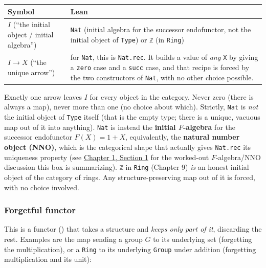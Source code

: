 \begin{longtable}[]{@{}
  >{\raggedright\arraybackslash}p{}
  >{\raggedright\arraybackslash}p{}@{}}
\toprule\noalign{}
\begin{minipage}[b]{\linewidth}\raggedright
Symbol
\end{minipage} & \begin{minipage}[b]{\linewidth}\raggedright
Lean
\end{minipage} \\
\midrule\noalign{}
\endhead
\bottomrule\noalign{}
\endlastfoot
\(I\) (``the initial object / initial algebra'') & \texttt{Nat} (initial algebra for the successor endofunctor, not the initial object of \texttt{Type}) or \texttt{ℤ} (in \texttt{Ring}) \\
\(I \to X\) (``the unique arrow'') & for \texttt{Nat}, this is \texttt{Nat.rec}. It builds a value of \emph{any} \texttt{X} by giving a \texttt{zero} case and a \texttt{succ} case, and that recipe is forced by the two constructors of \texttt{Nat}, with no other choice possible. \\
\end{longtable}

Exactly one arrow leaves \(I\) for every object in the category. Never zero (there is always a map), never more than one (no choice about which). Strictly, \texttt{Nat} is \emph{not} the initial object of \texttt{Type} itself (that is the empty type; there is a unique, vacuous map out of it into anything). \texttt{Nat} is instead the \textbf{initial \(F\)-algebra} for the successor endofunctor \(F(X) = 1 + X\), equivalently, the \textbf{natural number object (NNO)}, which is the categorical shape that actually gives \texttt{Nat.rec} its uniqueness property (see \hyperref[sec:01-basics:01-everything-has-a-type:1]{Chapter 1, Section 1} for the worked-out \(F\)-algebra/NNO discussion this box is summarizing). \texttt{ℤ} in \texttt{Ring} (Chapter 9) \emph{is} an honest initial object of the category of rings. Any structure-preserving map out of it is forced, with no choice involved.

\subsubsection{Forgetful functor}\label{sec:02-terminology-and-coc:01-terminology:9}

This is a functor (\cite{MacLane1998}) that takes a structure and \emph{keeps only part of it}, discarding the rest. Examples are the map sending a group \(G\) to its underlying set (forgetting the multiplication), or a \texttt{Ring} to its underlying \texttt{Group} under addition (forgetting multiplication and its unit):

